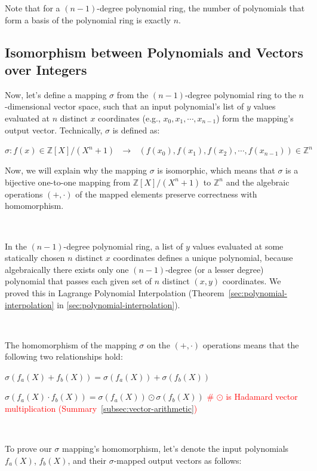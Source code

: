 Note that for a $(n-1)$-degree polynomial ring, the number of polynomials that form a basis of the polynomial ring is exactly $n$.


\subsection{Isomorphism between Polynomials and Vectors over Integers}
\label{subsec:poly-vector-transformation}



Now, let's define a mapping $\sigma$ from the $(n-1)$-degree polynomial ring to the $n$-dimensional vector space, such that an input polynomial's list of $y$ values evaluated at $n$ distinct $x$ coordinates (e.g., $x_0, x_1, \cdots, x_{n-1}$) form the mapping's output vector. Technically, $\sigma$ is defined as:

$\sigma: f(x) \in \mathbb{Z}[X] / (X^n + 1) \text{ } \longrightarrow \text{ } (f(x_0), f(x_1), f(x_2), \cdots, f(x_{n-1})) \in \mathbb{Z}^n$

Now, we will explain why the mapping $\sigma$ is isomorphic, which means that $\sigma$ is a bijective one-to-one mapping from $\mathbb{Z}[X] / (X^n + 1)$ to $\mathbb{Z}^n$ and the algebraic operations $(+, \cdot)$ of the mapped elements preserve correctness with homomorphism.

$ $

 In the $(n-1)$-degree polynomial ring, a list of $y$ values evaluated at some statically chosen $n$ distinct $x$ coordinates defines a unique polynomial, because algebraically there exists only one $(n-1)$-degree (or a lesser degree) polynomial that passes each given set of $n$ distinct $(x, y)$ coordinates. We proved this in Lagrange Polynomial Interpolation (Theorem~\ref*{sec:polynomial-interpolation} in \autoref{sec:polynomial-interpolation}). 

$ $

 The homomorphism of the mapping $\sigma$ on the $(+, \cdot)$ operations means that the following two relationships hold: 

$\sigma(f_a(X) + f_b(X)) = \sigma(f_a(X)) + \sigma(f_b(X))$

$\sigma(f_a(X) \cdot f_b(X)) = \sigma(f_a(X)) \odot \sigma(f_b(X))$ \textcolor{red}{ \text{ } \# $\odot$ is Hadamard vector multiplication (Summary~\ref*{subsec:vector-arithmetic})}

$ $

To prove our $\sigma$ mapping's homomorphism, let's denote the input polynomials $f_a(X)$, $f_b(X)$, and their $\sigma$-mapped output vectors as follows:


